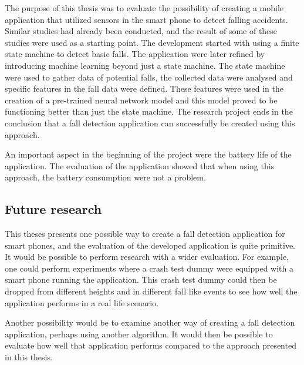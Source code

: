 \documentclass[12pt, a4paper, onecolumn]{article}
\begin{document}
	The purpose of this thesis was to evaluate the possibility of creating a mobile application that utilized sensors in the smart phone to detect falling accidents. Similar studies had already been conducted, and the result of some of these studies were used as a starting point. The development started with using a finite state machine to detect basic falls. The application were later refined by introducing machine learning beyond just a state machine. The state machine were used to gather data of potential falls, the collected data were analysed and specific features in the fall data were defined. These features were used in the creation of a pre-trained neural network model and this model proved to be functioning better than just the state machine. The research project ends in the conclusion that a fall detection application can successfully be created using this approach.
	
	An important aspect in the beginning of the project were the battery life of the application. The evaluation of the application showed that when using this approach, the battery consumption were not a problem.
	
	\subsection{Future research}
	
	This theses presents one possible way to create a fall detection application for smart phones, and the evaluation of the developed application is quite primitive. It would be possible to perform research with a wider evaluation. For example, one could perform experiments where a crash test dummy were equipped with a smart phone running the application. This crash test dummy could then be dropped from different heights and in different fall like events to see how well the application performs in a real life scenario.
	
	Another possibility would be to examine another way of creating a fall detection application, perhaps using another algorithm. It would then be possible to evaluate how well that application performs compared to the approach presented in this thesis.
	
	\newpage
		
	
	
\end{document}
